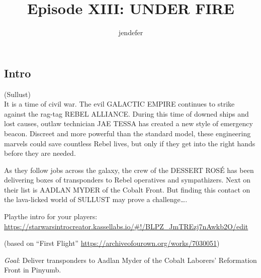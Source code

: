 \documentclass{book}
\title{Episode XIII: UNDER FIRE}
\author{jendefer}
\begin{document}
\maketitle

\begin{multicols}{2}
\section{Intro}
(Sullust)\\

It is a time of civil war. The evil GALACTIC EMPIRE continues to strike against the rag-tag REBEL ALLIANCE. During this time of downed ships and lost causes, outlaw technician JAE TESSA has created a new style of emergency beacon. Discreet and more powerful than the standard model, these engineering marvels could save countless Rebel lives, but only if they get into the right hands before they are needed.

As they follow jobs across the galaxy, the crew of the DESSERT ROSÉ has been delivering boxes of transponders to Rebel operatives and sympathizers. Next on their list is AADLAN MYDER of the Cobalt Front. But finding this contact on the lava-licked world of SULLUST may prove a challenge….

Playthe intro for your players: \url{https://starwarsintrocreator.kassellabs.io/#!/BLPZ_JmTREzj7nAwkb2O/edit}

(based on ``First Flight'' \url{https://archiveofourown.org/works/7030051})

\emph{Goal}: Deliver transponders to Aadlan Myder of the Cobalt Laborers’ Reformation Front in Pinyumb.\\


\end{multicols}
\end{document}
